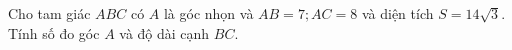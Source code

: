 \begin{bt}%
Cho tam giác $ABC$ có $A$ là góc nhọn và $AB=7; AC=8$ và diện tích $S=14 \sqrt{3}$. Tính số đo góc $A$ và độ dài cạnh $BC$.
\end{bt}


